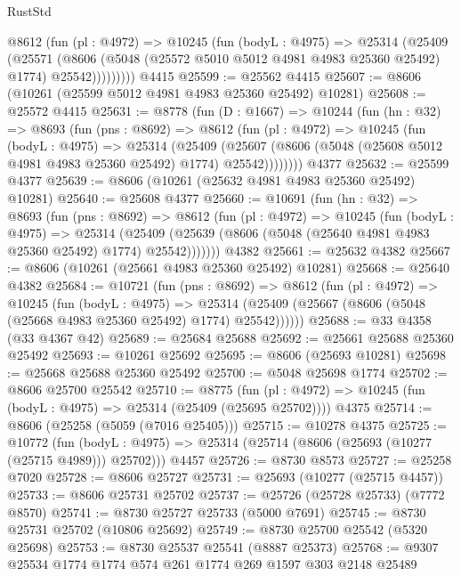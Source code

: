 \begin{lexlean}{RustStd}
\begin{coremodule}
          @8612
            (fun (pl : @4972) =>
            @10245
              (fun (bodyL : @4975) =>
              @25314
                (@25409
                  (@25571
                    (@8606
                      (@5048 (@25572 @5010 @5012 @4981 @4983 @25360 @25492) @1774)
                      @25542)))))))))
    @4415
@25599 := @25562 @4415
@25607 := @8606 (@10261 (@25599 @5012 @4981 @4983 @25360 @25492) @10281)
@25608 := @25572 @4415
@25631 := @8778
    (fun (D : @1667) =>
    @10244
      (fun (hn : @32) =>
      @8693
        (fun (pns : @8692) =>
        @8612
          (fun (pl : @4972) =>
          @10245
            (fun (bodyL : @4975) =>
            @25314
              (@25409
                (@25607 (@8606 (@5048 (@25608 @5012 @4981 @4983 @25360 @25492) @1774) @25542))))))))
    @4377
@25632 := @25599 @4377
@25639 := @8606 (@10261 (@25632 @4981 @4983 @25360 @25492) @10281)
@25640 := @25608 @4377
@25660 := @10691
    (fun (hn : @32) =>
    @8693
      (fun (pns : @8692) =>
      @8612
        (fun (pl : @4972) =>
        @10245
          (fun (bodyL : @4975) =>
          @25314
            (@25409 (@25639 (@8606 (@5048 (@25640 @4981 @4983 @25360 @25492) @1774) @25542)))))))
    @4382
@25661 := @25632 @4382
@25667 := @8606 (@10261 (@25661 @4983 @25360 @25492) @10281)
@25668 := @25640 @4382
@25684 := @10721
    (fun (pns : @8692) =>
    @8612
      (fun (pl : @4972) =>
      @10245
        (fun (bodyL : @4975) =>
        @25314 (@25409 (@25667 (@8606 (@5048 (@25668 @4983 @25360 @25492) @1774) @25542))))))
@25688 := @33 @4358 (@33 @4367 @42)
@25689 := @25684 @25688
@25692 := @25661 @25688 @25360 @25492
@25693 := @10261 @25692
@25695 := @8606 (@25693 @10281)
@25698 := @25668 @25688 @25360 @25492
@25700 := @5048 @25698 @1774
@25702 := @8606 @25700 @25542
@25710 := @8775
    (fun (pl : @4972) => @10245 (fun (bodyL : @4975) => @25314 (@25409 (@25695 @25702))))
    @4375
@25714 := @8606 (@25258 (@5059 (@7016 @25405)))
@25715 := @10278 @4375
@25725 := @10772
    (fun (bodyL : @4975) => @25314 (@25714 (@8606 (@25693 (@10277 (@25715 @4989))) @25702)))
    @4457
@25726 := @8730 @8573
@25727 := @25258 @7020
@25728 := @8606 @25727
@25731 := @25693 (@10277 (@25715 @4457))
@25733 := @8606 @25731 @25702
@25737 := @25726 (@25728 @25733) (@7772 @8570)
@25741 := @8730 @25727 @25733 (@5000 @7691)
@25745 := @8730 @25731 @25702 (@10806 @25692)
@25749 := @8730 @25700 @25542 (@5320 @25698)
@25753 := @8730 @25537 @25541 (@8887 @25373)
@25768 := @9307
    @25534
    @1774
    @1774
    @574
    @261
    @1774
    @269
    @1597
    @303
    @2148
    @25489

\end{coremodule}
\end{lexlean}
